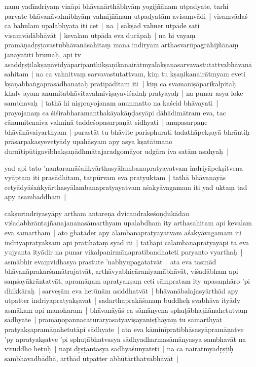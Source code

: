 \documentclass[article,12pt,a4paper]{memoir}
\begin{document}
	  \pstart nanu yadīndriyaṃ vināpi bhāvanārthābhyāṃ yogijñānam utpadyate, tarhi parvate bhāvanāvahnibhyāṃ vahnijñānam utpadyatām avisaṃvādi | visaṃvādaś ca bahulam upalabhyata iti cet | na | sākṣād vahner utpāde sati visaṃvādābhāvāt | kevalam utpāda eva durāpaḥ | na hi vayaṃ pramāṇadṛṣṭavastubhāvanāsahitaṃ mana indiryam arthasvarūpagrāhijñānaṃ janayatīti brūmaḥ, api tv asaddṛṣṭilakṣaṇāvidyāparipanthikṣaṇikanairātmyalakṣaṇasarvavastutattvabhāvanāsahitam | na ca vahnitvaṃ sarvavastutattvam, kiṃ tu kṣaṇikanairātmyam eveti kṣaṇabhaṅgaprasādhanataḥ pratipāditam iti | kiṃ ca svamanīṣāparikalpitaḥ khalv ayam anumitabhāvitavahniviṣayaviśadaḥ pratyayaḥ | na punar asya loke sambhavaḥ | tathā hi niṣprayojanam anunmatto na kaścid bhāvayati | prayojanaṃ ca śiśirabharamanthakāyakāṇḍasyāpi dāhādimātram eva, tac cānumitenaiva vahninā taddeśopasarpaṇāt sidhyati | anupasarpaṇe bhāvānāvaiyarthyam | purastāt tu bhāvite parisphurati tadathāpekṣayā bhrāntiḥ prāsarpakasyevetyādy upahāsyam apy asya kṣatātmano durnītipūtigavībhakṣaṇādhmātajaradgomāyor udgāra iva satām asahyaḥ | 
	\pend
      

	  \pstart yad api tato 'nantaramāśaṅkyārthasyālambanapratyayatvam indriyāpekṣitvena vyāptam iti prasādhitam, tatpūrvam eva pratyuktam | tathā bhāvanayās cetyādyāśaṅkyārthasyālambanapratyayatvam aśakyāvagamam iti yad uktaṃ tad apy asambaddham | 
	\pend
      

	  \pstart cakṣurindriyasyāpy artham antareṇa dvicandrakeśoṇḍukādau viśadabhrāntajñanajananasāmarthyam upalabdham ity arthasahitam api kevalam eva samartham | ato ghaṭāder apy ālambanapratyayatvam aśakyāvagamam iti indriyapratyakṣam api pratihataṃ syād iti | tathāpi cālambanapratyayāpi ta eva yujyanta ityādir na punar vikalpanirmāṇapratibandhateti paryanto vyarthaḥ | asmābhir evaṃvidhasya prastute 'nabhyupagatatvāt | ata eva tasmād bhāvanāprakarśamātrajatvāt, arthāvyabhicāraniyamābhāvāt, viśadābham api saṃśayākrāntatvāt, apramāṇam apratyakṣaṃ ceti sāmpratam ity upasaṃhāro 'pi dhikkāraḥ | sarveṣām eva hetūnām asiddhatvāt | bhāvanābalajasyārthād apy utpatter indriyapratyakṣavat | sadarthaprakāśanaṃ buddheḥ svabhāva ityādy asmākam api manoharam | bhāvanāyāś ca sāmānyena sphuṭābhajñānahetutvaṃ sādhyate | pramāṇopannacaturāryasatyaviṣayaniṣṭhāyāṃ tu sāmarthyāt pratyakṣapramāṇahetutāpi sādhyate | ata eva kāminīpratibhāsasyāpramāṇatve 'py apratyakṣatve 'pi sphuṭābhatvasya sādhyadharmasāmānyasya sambhavāt na viruddho hetuḥ | nāpi dṛṣṭāntasya sādhyaśūnyateti | na ca nairātmyadṛṣṭiḥ sambhavadbādhā, arthād utpatter abhūtārthatvābhāvāt | 
	\pend
      
\end{document}
